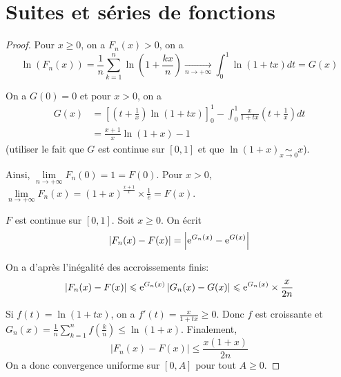 \section{Suites et séries de fonctions}

\begin{proof}
    Pour $x\geqslant0$, on a $F_{n}(x)>0$, on a 
    \begin{equation}
        \ln\left(F_{n}(x)\right)=\frac{1}{n}\sum_{k=1}^{n}\ln\left(1+\frac{kx}{n}\right)\xrightarrow[n\to+\infty]{}\int_{0}^{1}\ln\left(1+tx\right)dt=G(x)
    \end{equation}

    On a $G(0)=0$ et pour $x>0$, on a
    \begin{align}
        G(x)
        &= \left[\left(t+\frac{1}{x}\right)\ln(1+tx)\right]_{0}^{1}-\int_{0}^{1}\frac{x}{1+tx}\left(t+\frac{1}{x}\right)dt\\
        &=\frac{x+1}{x}\ln(1+x)-1
    \end{align}
    (utiliser le fait que $G$ est continue sur $[0,1]$ et que $\ln(1+x)\underset{x\to0}{\sim}x$).

    Ainsi, $\lim\limits_{n\to+\infty}F_{n}(0)=1=F(0)$.
    Pour $x>0$, $\lim\limits_{n\to+\infty}F_{n}(x)=\left(1+x\right)^{\frac{x+1}{x}}\times\frac{1}{e}=F(x)$.

    $F$ est continue sur $[0,1]$. Soit $x\geqslant0$. On écrit 
    \begin{equation}
        \left\lvert F_{n}(x)-F(x)\right\rvert=\left\lvert\mathrm{e}^{G_{n}(x)}-\mathrm{e}^{G(x)}\right\rvert
    \end{equation}

    
    On a d'après l'inégalité des accroissements finis: 
    \begin{equation}
        \left\lvert F_{n}(x)-F(x)\right\rvert\leqslant\mathrm{e}^{G_{n}(x)}\left\lvert G_{n}(x)-G(x)\right\rvert\leqslant\mathrm{e}^{G_{n}(x)}\times\frac{x}{2n}
    \end{equation}
    
    Si $f(t)=\ln\left(1+tx\right)$, on a $f'(t)=\frac{x}{1+tx}\geqslant0$. Donc $f$ est croissante et $G_{n}(x)=\frac{1}{n}\sum_{k=1}^{n}f\left(\frac{k}{n}\right)\leqslant\ln(1+x)$. Finalement, 
    \begin{equation}
        \left\lvert F_{n}(x)-F(x)\right\rvert\leqslant\frac{x(1+x)}{2n}
    \end{equation}
    On a donc convergence uniforme sur $[0,A]$ pour tout $A\geqslant0$.
\end{proof}

